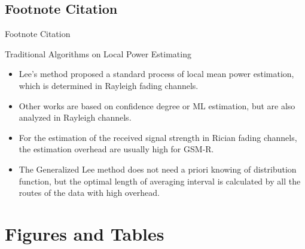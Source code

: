 \subsection{Footnote Citation}
\begin{frame}{Footnote Citation}
\begin{exampleblock}{Traditional Algorithms on Local Power Estimating}
\begin{itemize}
  \item Lee's method proposed a standard process of local mean power estimation, which is determined in Rayleigh fading channels.
  \item Other works are based on confidence degree or ML estimation, but are also analyzed in Rayleigh channels.
  \item For the estimation of the received signal strength in Rician fading channels, the estimation overhead are usually high for GSM-R.
  \item The Generalized Lee method does not need a priori knowing of distribution function, but the optimal length of averaging interval is calculated by all the routes of the data with high overhead.
\end{itemize}
\end{exampleblock}
\end{frame}

\section{Figures and Tables}\label{sect:intro}
